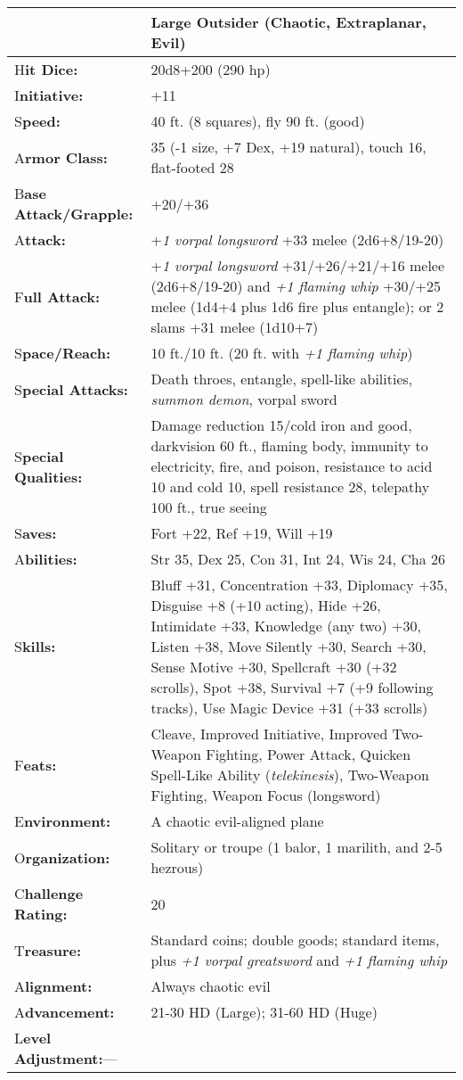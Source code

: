 \documentclass{article}
\begin{document}
\begin{tabular}{|>{\raggedright}p{91pt}|>{\raggedright}p{235pt}|}
\hline
  & Large Outsider (Chaotic, Extraplanar, Evil)\tabularnewline
\hline
H\textbf{it Dice:} & 20d8+200 (290 hp)\tabularnewline
\hline
I\textbf{nitiative:} & +11\tabularnewline
\hline
S\textbf{peed:} & 40 ft. (8 squares), fly 90 ft. (good)\tabularnewline
\hline
A\textbf{rmor Class:} & 35 (-1 size, +7 Dex, +19 natural), touch 16, flat-footed 
28\tabularnewline
\hline
B\textbf{ase Attack/Grapple:} & +20/+36\tabularnewline
\hline
A\textbf{ttack:} & +\textit{1 vorpal longsword }+33 melee (2d6+8/19-20)\tabularnewline
\hline
F\textbf{ull Attack:} & +\textit{1 vorpal longsword }+31/+26/+21/+16 melee (2d6+8/19-20) 
and \textit{+1 flaming whip }+30/+25 melee (1d4+4 plus 1d6 fire plus entangle); 
or 2 slams +31 melee (1d10+7)\tabularnewline
\hline
S\textbf{pace/Reach:} & 10 ft./10 ft. (20 ft. with \textit{+1 flaming whip})\tabularnewline
\hline
S\textbf{pecial Attacks:} & Death throes, entangle, spell-like abilities, \textit{summon 
demon}, vorpal sword\tabularnewline
\hline
S\textbf{pecial Qualities:} & Damage reduction 15/cold iron and good, darkvision 
60 ft., flaming body, immunity to electricity, fire, and poison, resistance to 
acid 10 and cold 10, spell resistance 28, telepathy 100 ft., true seeing\tabularnewline
\hline
S\textbf{aves:} & Fort +22, Ref +19, Will +19\tabularnewline
\hline
A\textbf{bilities:} & Str 35, Dex 25, Con 31, Int 24, Wis 24, Cha 26\tabularnewline
\hline
S\textbf{kills:} & Bluff +31, Concentration +33, Diplomacy +35, Disguise +8 (+10 
acting), Hide +26, Intimidate +33, Knowledge (any two) +30, Listen +38, Move Silently 
+30, Search +30, Sense Motive +30, Spellcraft +30 (+32 scrolls), Spot +38, Survival 
+7 (+9 following tracks), Use Magic Device +31 (+33 scrolls)\tabularnewline
\hline
F\textbf{eats:} & Cleave, Improved Initiative, Improved Two-Weapon Fighting, Power 
Attack, Quicken Spell-Like Ability (\textit{telekinesis}), Two-Weapon Fighting, 
Weapon Focus (longsword)\tabularnewline
\hline
E\textbf{nvironment:} & A chaotic evil-aligned plane\tabularnewline
\hline
O\textbf{rganization:} & Solitary or troupe (1 balor, 1 marilith, and 2-5 hezrous)\tabularnewline
\hline
C\textbf{hallenge Rating:} & 20\tabularnewline
\hline
T\textbf{reasure:} & Standard coins; double goods; standard items, plus \textit{+1 
vorpal greatsword }and \textit{+1 flaming whip}\tabularnewline
\hline
A\textbf{lignment:} & Always chaotic evil\tabularnewline
\hline
A\textbf{dvancement:} & 21-30 HD (Large); 31-60 HD (Huge)\tabularnewline
\hline
L\textbf{evel Adjustment:}--- & \tabularnewline
\hline
\end{tabular}
\end{document}
